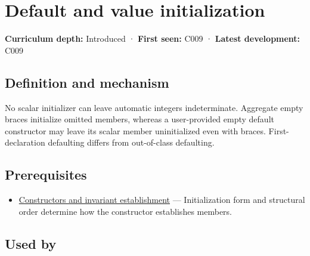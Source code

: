 \hypertarget{appendix-ba8c1a9fe03f}{}\label{referencestart:appendix-ba8c1a9fe03f}
\section{Default and value initialization}\label{appendix-ba8c1a9fe03f-default-and-value-initialization}

\hypertarget{appendix-ba8c1a9fe03f-default-and-value-initialization}{}

\textbf{Curriculum depth:} Introduced · \textbf{First seen:} C009 · \textbf{Latest development:} C009

\begin{allmightroledefinition}

\subsection{Definition and mechanism}\label{appendix-ba8c1a9fe03f-definition-and-mechanism}

\hypertarget{appendix-ba8c1a9fe03f-definition-and-mechanism}{}

No scalar initializer can leave automatic integers indeterminate. Aggregate empty braces initialize omitted members, whereas a user-provided empty default constructor may leave its scalar member uninitialized even with braces. First-declaration defaulting differs from out-of-class defaulting.

\end{allmightroledefinition}

\subsection{Prerequisites}\label{appendix-ba8c1a9fe03f-prerequisites}

\hypertarget{appendix-ba8c1a9fe03f-prerequisites}{}

\begin{itemize}
\tightlist
\item
  \hyperref[appendix-7f8ec83d0886]{Constructors and invariant establishment} --- Initialization form and structural order determine how the constructor establishes members.
\end{itemize}

\subsection{Used by}\label{appendix-ba8c1a9fe03f-used-by}

